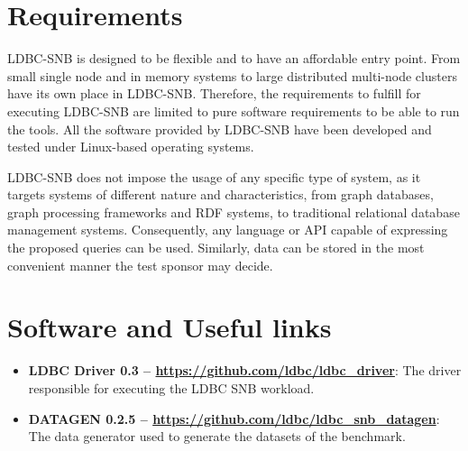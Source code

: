 

\section{Requirements}

LDBC-SNB is designed to be flexible and to have an affordable entry point.
From small single node and in memory systems to large distributed multi-node
clusters have its own place in LDBC-SNB.  Therefore, the requirements to
fulfill for executing LDBC-SNB are limited to pure software requirements to be
able to run the tools. All the software provided by LDBC-SNB have been
developed and tested under Linux-based operating systems.

LDBC-SNB does not impose the usage of any specific type of system, as it
targets systems of different nature and characteristics, from graph databases,
graph processing frameworks and RDF systems, to traditional relational database
management systems. Consequently, any language or API capable of expressing the
proposed queries can be used. Similarly, data can be stored in the most
convenient manner the test sponsor may decide.


\section{Software and Useful links} 

\begin{itemize}
    \item \textbf{LDBC Driver 0.3 -- \url{https://github.com/ldbc/ldbc_driver}}: The driver
    responsible for executing the LDBC SNB workload.
    \item \textbf{DATAGEN 0.2.5 -- \url{https://github.com/ldbc/ldbc_snb_datagen}}: The data
    generator used to generate the datasets of the benchmark.
\end{itemize}


%
%
%
%




